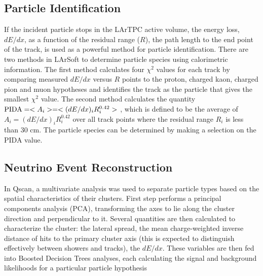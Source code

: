 %


\subsection{Particle Identification}


If the incident particle stops in the LArTPC active volume, the energy
loss, $dE/dx$, as a function of the residual range ($R$), the path
length to the end point of the track, is used as a powerful method for
particle identification. There are two methods in LArSoft to determine
particle species using calorimetric information. The first method
calculates four $\chi^{2}$ values for each track by comparing measured
$dE/dx$ versus $R$ points to the proton, charged kaon, charged pion
and muon hypotheses and identifies the track as the particle that
gives the smallest $\chi^{2}$ value. The second method calculates the
quantity ${\rm{PIDA}} = <A_{i}> = <(dE/dx)_{i}R_{i}^{0.42}>$ \cite{Thomas:1987zz},
which is defined to be the average of $A_{i} =
(dE/dx)_{i}R_{i}^{0.42}$ over all track points where the residual
range $R_{i}$ is less than 30 cm. The particle species can be
determined by making a selection on the PIDA value.


\subsection{Neutrino Event Reconstruction}


In Qscan, a multivariate analysis was used to separate particle types based on the spatial characteristics of their clusters.
First step performs a principal components analysis (PCA), transforming the axes to lie along the 
cluster direction and perpendicular to it. Several quantities are then calculated to 
characterize the cluster: the lateral spread, the mean charge-weighted inverse distance of hits to the primary cluster axis
(this is expected to distinguish effectively between showers and tracks), the $dE/dx$.
These variables are then fed into Boosted Decision Trees analyses, 
each calculating the signal and background likelihoods for a particular particle hypothesis

